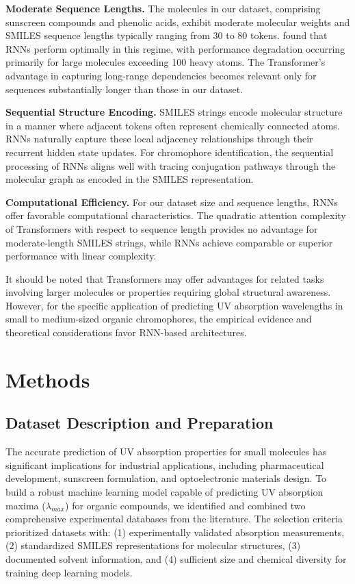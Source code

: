 \documentclass[11pt,a4paper]{article}
\begin{document}
\textbf{Moderate Sequence Lengths.} The molecules in our dataset, comprising sunscreen compounds and phenolic acids, exhibit moderate molecular weights and SMILES sequence lengths typically ranging from 30 to 80 tokens. \citet{chenMolecularLanguageModels2023} found that RNNs perform optimally in this regime, with performance degradation occurring primarily for large molecules exceeding 100 heavy atoms. The Transformer's advantage in capturing long-range dependencies becomes relevant only for sequences substantially longer than those in our dataset.

\textbf{Sequential Structure Encoding.} SMILES strings encode molecular structure in a manner where adjacent tokens often represent chemically connected atoms. RNNs naturally capture these local adjacency relationships through their recurrent hidden state updates. For chromophore identification, the sequential processing of RNNs aligns well with tracing conjugation pathways through the molecular graph as encoded in the SMILES representation.

\textbf{Computational Efficiency.} For our dataset size and sequence lengths, RNNs offer favorable computational characteristics. The quadratic attention complexity of Transformers with respect to sequence length provides no advantage for moderate-length SMILES strings, while RNNs achieve comparable or superior performance with linear complexity.

It should be noted that Transformers may offer advantages for related tasks involving larger molecules or properties requiring global structural awareness. However, for the specific application of predicting UV absorption wavelengths in small to medium-sized organic chromophores, the empirical evidence and theoretical considerations favor RNN-based architectures.


\section{Methods}

\subsection{Dataset Description and Preparation}


The accurate prediction of UV absorption properties for small molecules has significant implications for industrial applications, including pharmaceutical development, sunscreen formulation, and optoelectronic materials design. To build a robust machine learning model capable of predicting UV absorption maxima ($\lambda_{max}$) for organic compounds, we identified and combined two comprehensive experimental databases from the literature. The selection criteria prioritized datasets with: (1) experimentally validated absorption measurements, (2) standardized SMILES representations for molecular structures, (3) documented solvent information, and (4) sufficient size and chemical diversity for training deep learning models.
\end{document}
